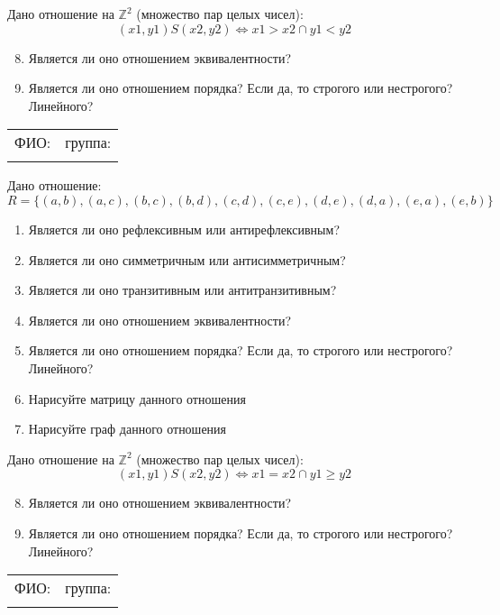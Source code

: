 \documentclass[russian,12pt]{article}
\begin{document}
Дано отношение на $\mathbb{Z}^2$ (множество пар целых чисел):
$$(x1, y1)S(x2, y2) \iff x1 > x2 \cap y1 < y2$$
\begin{enumerate}
\setcounter{enumi}{7}
\item Является ли оно отношением эквивалентности?
\item Является ли оно отношением порядка? Если да, то строгого или нестрогого? Линейного?
\end{enumerate}
\newpage
\thispagestyle{empty}
\begin{tabular}{|p{}|p{}|}
\hline
ФИО: & группа: \\
 & \\ \hline
\end{tabular}

\vspace{12pt}

Дано отношение:
$$R = \{(a, b), (a, c), (b, c), (b, d), (c, d), (c, e), (d, e), (d, a), (e, a), (e, b)\}$$
\begin{enumerate}
\item Является ли оно рефлексивным или антирефлексивным?
\item Является ли оно симметричным или антисимметричным?
\item Является ли оно транзитивным или антитранзитивным?
\item Является ли оно отношением эквивалентности?
\item Является ли оно отношением порядка? Если да, то строгого или нестрогого? Линейного?
\item Нарисуйте матрицу данного отношения
\item Нарисуйте граф данного отношения
\end{enumerate}

Дано отношение на $\mathbb{Z}^2$ (множество пар целых чисел):
$$(x1, y1)S(x2, y2) \iff x1 = x2 \cap y1 \ge y2$$
\begin{enumerate}
\setcounter{enumi}{7}
\item Является ли оно отношением эквивалентности?
\item Является ли оно отношением порядка? Если да, то строгого или нестрогого? Линейного?
\end{enumerate}
\newpage
\thispagestyle{empty}
\begin{tabular}{|p{}|p{}|}
\hline
ФИО: & группа: \\
 & \\ \hline
\end{tabular}
\end{document}
